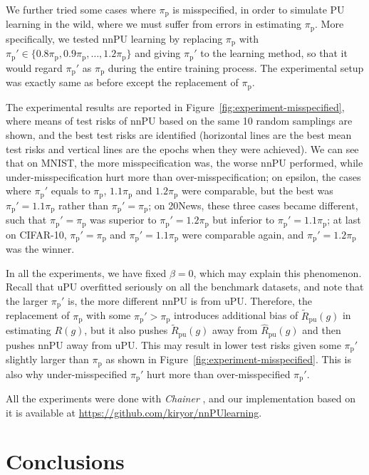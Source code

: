 \documentclass{article}
\newcommand{\pip}{\pi_\mathrm{p}}
\newcommand{\hRpu}{\widehat{R}_\mathrm{pu}}
\newcommand{\tRpu}{\widetilde{R}_\mathrm{pu}}
\begin{document}
We further tried some cases where $\pip$ is misspecified, in order to simulate PU learning in the wild, where we must suffer from errors in estimating $\pip$. More specifically, we tested nnPU learning by replacing $\pip$ with $\pip'\in\{0.8\pip,0.9\pip,\ldots,1.2\pip\}$ and giving $\pip'$ to the learning method, so that it would regard $\pip'$ as $\pip$ during the entire training process. The experimental setup was exactly same as before except the replacement of $\pip$.

The experimental results are reported in Figure~\ref{fig:experiment-misspecified}, where means of test risks of nnPU based on the same 10 random samplings are shown, and the best test risks are identified (horizontal lines are the best mean test risks and vertical lines are the epochs when they were achieved). We can see that
on MNIST, the more misspecification was, the worse nnPU performed, while under-misspecification hurt more than over-misspecification;
on epsilon, the cases where $\pip'$ equals to $\pip$, $1.1\pip$ and $1.2\pip$ were comparable, but the best was $\pip'=1.1\pip$ rather than $\pip'=\pip$;
on 20News, these three cases became different, such that $\pip'=\pip$ was superior to $\pip'=1.2\pip$ but inferior to $\pip'=1.1\pip$; at last on CIFAR-10, $\pip'=\pip$ and $\pip'=1.1\pip$ were comparable again, and $\pip'=1.2\pip$ was the winner.

In all the experiments, we have fixed $\beta=0$, which may explain this phenomenon. Recall that uPU overfitted seriously on all the benchmark datasets, and note that the larger $\pip'$ is, the more different nnPU is from uPU. Therefore, the replacement of $\pip$ with some $\pip'>\pip$ introduces additional bias of $\tRpu(g)$ in estimating $R(g)$, but it also pushes $\tRpu(g)$ away from $\hRpu(g)$ and then pushes nnPU away from uPU. This may result in lower test risks given some $\pip'$ slightly larger than $\pip$ as shown in Figure~\ref{fig:experiment-misspecified}. This is also why under-misspecified $\pip'$ hurt more than over-misspecified $\pip'$.

All the experiments were done with \emph{Chainer} \citep{tokui15mlsys}, and our implementation based on it is available at \url{https://github.com/kiryor/nnPUlearning}.

\section{Conclusions}
\label{sec:concl}%
\end{document}
